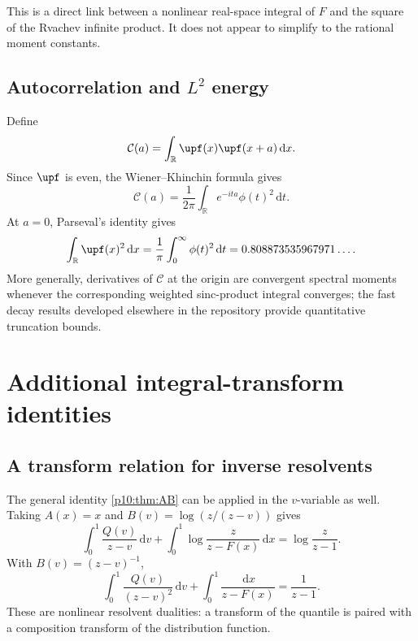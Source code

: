 \documentclass[11pt,oneside]{article}
\theoremstyle{definition}
\theoremstyle{remark}
\newcommand{\F}{F}
\newcommand{\Q}{Q}
\newcommand{\R}{\mathbb R}
\newcommand{\dd}{\,\mathrm d}
\newcommand{\1}{\mathbf 1}
\begin{document}
This is a direct link between a nonlinear real-space integral of \(\F\) and the square
of the Rvachev infinite product.  It does not appear to simplify to the rational moment
constants.

\subsection{Autocorrelation and \(L^2\) energy}

Define
\begin{equation}\label{p10:eq:Cautocorr}
 \mathcal C(a)=\int_\R\upf(x)\upf(x+a)\dd x.
\end{equation}
Since \(\upf\) is even, the Wiener--Khinchin formula gives
\begin{equation}\label{p10:eq:autocorr-Fourier}
 \mathcal C(a)=\frac1{2\pi}
 \int_\R e^{-ita}\phi(t)^2\dd t.
\end{equation}
At \(a=0\), Parseval's identity gives
\begin{equation}\label{p10:eq:up-L2}
 \int_\R\upf(x)^2\dd x
 =\frac1\pi\int_0^\infty\phi(t)^2\dd t
 =0.808873535967971\ldots.
\end{equation}
More generally, derivatives of \(\mathcal C\) at the origin are convergent spectral
moments whenever the corresponding weighted sinc-product integral converges; the fast
decay results developed elsewhere in the repository provide quantitative truncation
bounds.

\section{Additional integral-transform identities}

\subsection{A transform relation for inverse resolvents}

The general identity \cref{p10:thm:AB} can be applied in the \(v\)-variable as well.  Taking
\(A(x)=x\) and
\(B(v)=\log(z/(z-v))\) gives
\begin{equation}\label{p10:eq:inverse-log-resolvent}
 \int_0^1\frac{\Q(v)}{z-v}\dd v
 +\int_0^1\log\frac{z}{z-\F(x)}\dd x
 =\log\frac{z}{z-1}.
\end{equation}
With \(B(v)=(z-v)^{-1}\),
\begin{equation}\label{p10:eq:inverse-square-resolvent}
 \int_0^1\frac{\Q(v)}{(z-v)^2}\dd v
 +\int_0^1\frac{\dd x}{z-\F(x)}
 =\frac1{z-1}.
\end{equation}
These are nonlinear resolvent dualities: a transform of the quantile is paired with a
composition transform of the distribution function.
\end{document}
